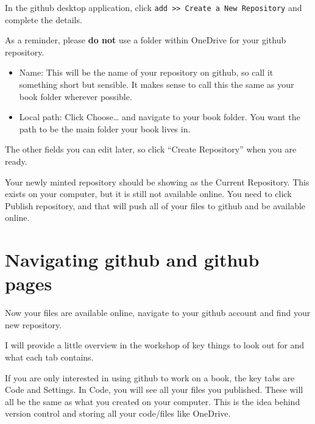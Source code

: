 \documentclass[
  letterpaper,
  DIV=11,
  numbers=noendperiod]{scrreprt}
\begin{document}
In the github desktop application, click
\texttt{add\ \textgreater{}\textgreater{}\ Create\ a\ New\ Repository}
and complete the details.

\begin{tcolorbox}[enhanced jigsaw, colbacktitle=quarto-callout-warning-color!10!white, titlerule=0mm, leftrule=.75mm, title=\textcolor{quarto-callout-warning-color}{\faExclamationTriangle}\hspace{0.5em}{Seriously, do not create github repositories within OneDrive}, breakable, bottomrule=.15mm, opacitybacktitle=0.6, rightrule=.15mm, opacityback=0, arc=.35mm, colframe=quarto-callout-warning-color-frame, toptitle=1mm, bottomtitle=1mm, toprule=.15mm, left=2mm, colback=white, coltitle=black]

As a reminder, please \textbf{do not} use a folder within OneDrive for
your github repository.

\end{tcolorbox}

\begin{itemize}
\item
  Name: This will be the name of your repository on github, so call it
  something short but sensible. It makes sense to call this the same as
  your book folder wherever possible.
\item
  Local path: Click Choose\ldots{} and navigate to your book folder. You
  want the path to be the main folder your book lives in.
\end{itemize}

The other fields you can edit later, so click ``Create Repository'' when
you are ready.

Your newly minted repository should be showing as the Current
Repository. This exists on your computer, but it is still not available
online. You need to click Publish repository, and that will push all of
your files to github and be available online.

\section{Navigating github and github
pages}\label{navigating-github-and-github-pages}

Now your files are available online, navigate to your github account and
find your new repository.

I will provide a little overview in the workshop of key things to look
out for and what each tab contains.

If you are only interested in using github to work on a book, the key
tabs are Code and Settings. In Code, you will see all your files you
published. These will all be the same as what you created on your
computer. This is the idea behind version control and storing all your
code/files like OneDrive.
\end{document}
